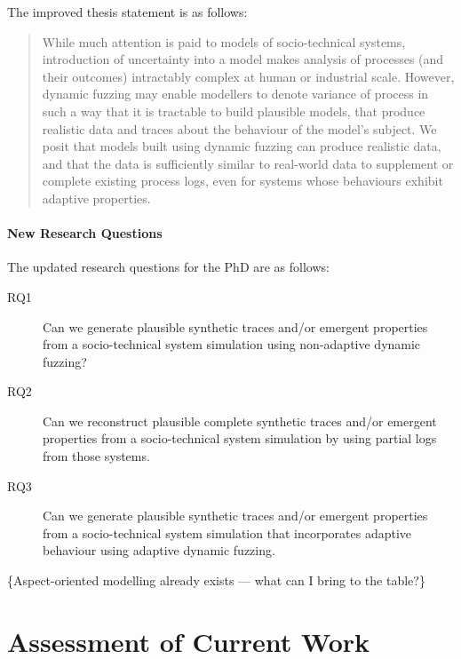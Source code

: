 \documentclass[11pt]{article}
\begin{document}
The improved thesis statement is as follows:

\begin{quote}
While much attention is paid to models of socio-technical systems,
introduction of uncertainty into a model makes analysis of processes (and their
outcomes) intractably complex at human or industrial scale. However, dynamic
fuzzing may enable modellers to denote variance of process in such a way that it
is tractable to build plausible models, that produce realistic data and traces
about the behaviour of the model’s subject. We posit that models built using
dynamic fuzzing can produce realistic data, and that the data is sufficiently
similar to real-world data to supplement or complete existing process logs, even
for systems whose behaviours exhibit adaptive properties.
\end{quote}

\subsection{New Research Questions}
\label{sec:orgf81a65a}

The updated research questions for the PhD are as follows:

\begin{description}
\item[RQ1] Can we generate plausible synthetic traces and/or emergent properties from a
   socio-technical system simulation using non-adaptive dynamic fuzzing?
\item[RQ2] Can we reconstruct plausible complete synthetic traces and/or emergent
   properties from a socio-technical system simulation by using partial logs
   from those systems.
\item[RQ3] Can we generate plausible synthetic traces and/or emergent properties from a
   socio-technical system simulation that incorporates adaptive behaviour using
   adaptive dynamic fuzzing.
\end{description}




\todo\{Aspect-oriented modelling already exists --- what can I bring to the
table?\}







\part{Assessment of Current Work}
\label{part:following_work}
\end{document}
